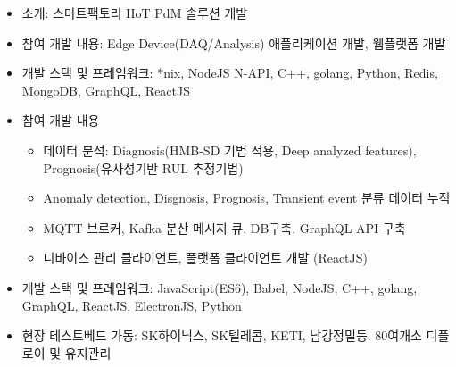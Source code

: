 
\label{pdmplatform}

\begin{itemize}[label=]
	\item 소개: 스마트팩토리 IIoT PdM 솔루션 개발
	\item 참여 개발 내용: Edge Device(DAQ/Analysis) 애플리케이션 개발, 웹플랫폼 개발
	\item 개발 스택 및 프레임워크: *nix, NodeJS N-API, C++, golang, Python, Redis, MongoDB, GraphQL, ReactJS
	\item 참여 개발 내용
	      \begin{itemize}[label=]
		      \item 데이터 분석: Diagnosis(HMB-SD 기법 적용, Deep analyzed features), Prognosis(유사성기반 RUL 추정기법)
		      \item Anomaly detection, Disgnosis, Prognosis, Transient event 분류 데이터 누적
		      \item MQTT 브로커, Kafka 분산 메시지 큐, DB구축, GraphQL API 구축
		      \item 디바이스 관리 클라이언트, 플랫폼 클라이언트 개발 (ReactJS)
	      \end{itemize}
	\item 개발 스택 및 프레임워크: JavaScript(ES6), Babel, NodeJS, C++, golang, GraphQL, ReactJS, ElectronJS, Python
	\item 현장 테스트베드 가동: SK하이닉스, SK텔레콤, KETI, 남강정밀등. 80여개소 디플로이 및 유지관리
\end{itemize}
